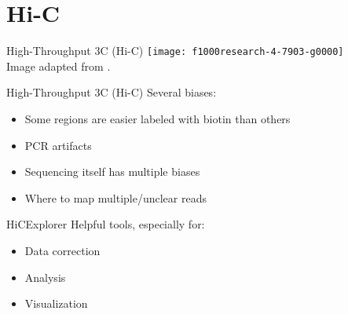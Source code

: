 \section{Hi-C}

\begin{frame}[c]{High-Throughput 3C (Hi-C)}
    \normalsize
    \texttt{[image: f1000research-4-7903-g0000]} \\
    Image adapted from \cite{wingett2015hicup}.
\end{frame}

\begin{frame}[c]{High-Throughput 3C (Hi-C)}
    Several biases:
    \begin{itemize}[<+(1)->]
        \item Some regions are easier labeled with biotin than others
        \item PCR artifacts \cite{wingett2015hicup}
        \item Sequencing itself has multiple biases \cite{aird2011analyzing}
        \item Where to map multiple/unclear reads
    \end{itemize}

\end{frame}





\begin{frame}[c]{HiCExplorer}
    \large
    Helpful tools, especially for:
    \begin{itemize}[<+(1)->]
        \item Data correction
        \item Analysis
        \item Visualization
    \end{itemize}
\end{frame}




